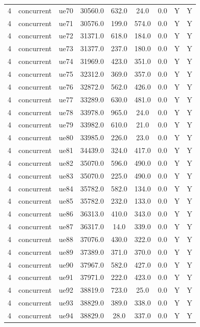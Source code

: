 \begin{table}[ht]
\begin{tabular}{|c|c|c|c|c|c|c|c|c|}
4 & concurrent & ue70 & 30560.0 & 632.0 & 24.0 & 0.0 & Y & Y \\
4 & concurrent & ue71 & 30576.0 & 199.0 & 574.0 & 0.0 & Y & Y \\
4 & concurrent & ue72 & 31371.0 & 618.0 & 184.0 & 0.0 & Y & Y \\
4 & concurrent & ue73 & 31377.0 & 237.0 & 180.0 & 0.0 & Y & Y \\
4 & concurrent & ue74 & 31969.0 & 423.0 & 351.0 & 0.0 & Y & Y \\
4 & concurrent & ue75 & 32312.0 & 369.0 & 357.0 & 0.0 & Y & Y \\
4 & concurrent & ue76 & 32872.0 & 562.0 & 426.0 & 0.0 & Y & Y \\
4 & concurrent & ue77 & 33289.0 & 630.0 & 481.0 & 0.0 & Y & Y \\
4 & concurrent & ue78 & 33978.0 & 965.0 & 24.0 & 0.0 & Y & Y \\
4 & concurrent & ue79 & 33982.0 & 610.0 & 21.0 & 0.0 & Y & Y \\
4 & concurrent & ue80 & 33985.0 & 226.0 & 23.0 & 0.0 & Y & Y \\
4 & concurrent & ue81 & 34439.0 & 324.0 & 417.0 & 0.0 & Y & Y \\
4 & concurrent & ue82 & 35070.0 & 596.0 & 490.0 & 0.0 & Y & Y \\
4 & concurrent & ue83 & 35070.0 & 225.0 & 490.0 & 0.0 & Y & Y \\
4 & concurrent & ue84 & 35782.0 & 582.0 & 134.0 & 0.0 & Y & Y \\
4 & concurrent & ue85 & 35782.0 & 232.0 & 133.0 & 0.0 & Y & Y \\
4 & concurrent & ue86 & 36313.0 & 410.0 & 343.0 & 0.0 & Y & Y \\
4 & concurrent & ue87 & 36317.0 & 14.0 & 339.0 & 0.0 & Y & Y \\
4 & concurrent & ue88 & 37076.0 & 430.0 & 322.0 & 0.0 & Y & Y \\
4 & concurrent & ue89 & 37389.0 & 371.0 & 370.0 & 0.0 & Y & Y \\
4 & concurrent & ue90 & 37967.0 & 582.0 & 427.0 & 0.0 & Y & Y \\
4 & concurrent & ue91 & 37971.0 & 222.0 & 423.0 & 0.0 & Y & Y \\
4 & concurrent & ue92 & 38819.0 & 723.0 & 25.0 & 0.0 & Y & Y \\
4 & concurrent & ue93 & 38829.0 & 389.0 & 338.0 & 0.0 & Y & Y \\
4 & concurrent & ue94 & 38829.0 & 28.0 & 337.0 & 0.0 & Y & Y \\

\end{tabular}
\end{table}
